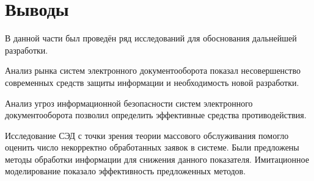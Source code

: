 \section{Выводы} \label{research_conclusion}

В данной части был проведён ряд исследований для обоснования дальнейшей разработки.

Анализ рынка систем электронного документооборота показал несовершенство современных средств защиты информации и необходимость новой разработки.

Анализ угроз информационной безопасности систем электронного документооборота позволил определить эффективные средства противодействия.

Исследование СЭД с точки зрения теории массового обслуживания помогло оценить число некорректно обработанных заявок в системе.
Были предложены методы обработки информации для снижения данного показателя.
Имитационное моделирование показало эффективность предложенных методов.